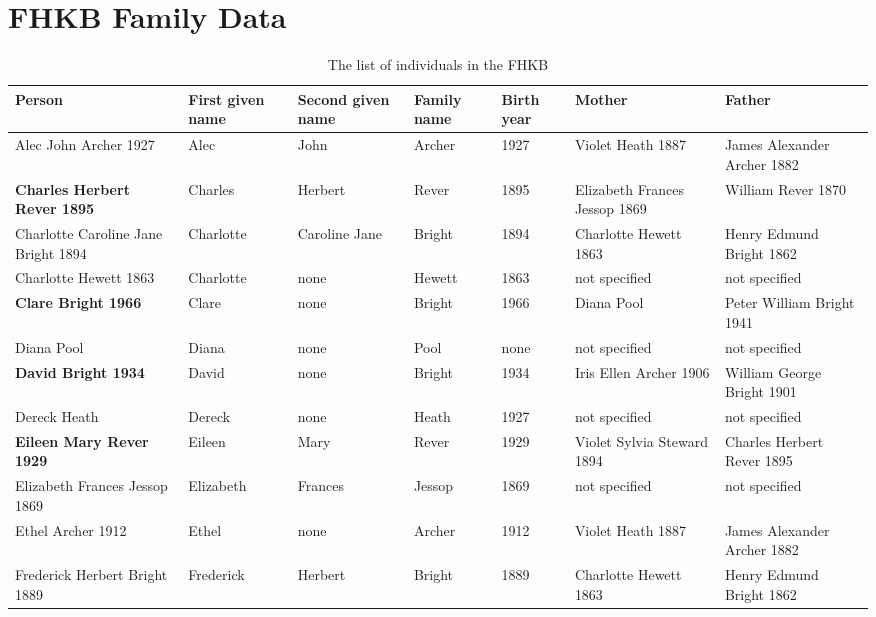 \chapter{FHKB Family Data}
\label{chap:familydata}
\begin{landscape}
\begingroup
\small
\begin{longtable}{lp{2cm}p{2cm}lp{2cm}ll}
\caption{The list of individuals in the FHKB}\\
\label{tab:familydata}
\endhead
\hline \multicolumn{7}{l}{\emph{continued..}}
\endfoot
\endlastfoot
\textbf{Person} & First given name & Second given name & Family name & Birth year & Mother & Father \\ \hline
Alec John Archer 1927 & Alec & John & Archer & 1927 & Violet Heath 1887  & James Alexander Archer 1882  \\
\textbf{Charles Herbert Rever 1895} & Charles & Herbert & Rever & 1895 & Elizabeth Frances Jessop 1869  & William Rever 1870  \\
Charlotte Caroline Jane Bright 1894 & Charlotte & Caroline Jane & Bright & 1894 & Charlotte Hewett 1863 & Henry Edmund Bright 1862 \\
Charlotte Hewett 1863 & Charlotte & none & Hewett & 1863 & not specified & not specified \\
\textbf{Clare Bright 1966} & Clare & none & Bright & 1966 & Diana Pool & Peter William Bright 1941  \\
Diana Pool & Diana & none & Pool & none & not specified & not specified  \\
\textbf{David Bright 1934} & David & none & Bright & 1934 & Iris Ellen Archer 1906  & William George Bright 1901  \\
Dereck Heath & Dereck & none & Heath & 1927 & not specified & not specified \\
\textbf{Eileen Mary Rever 1929} & Eileen & Mary & Rever & 1929 & Violet Sylvia Steward 1894  & Charles Herbert Rever 1895  \\
Elizabeth Frances Jessop 1869 & Elizabeth & Frances & Jessop & 1869 & not specified & not specified \\
Ethel Archer 1912 & Ethel & none & Archer & 1912 & Violet Heath 1887  & James Alexander Archer 1882  \\
Frederick Herbert Bright 1889 & Frederick & Herbert & Bright & 1889 & Charlotte Hewett 1863  & Henry Edmund Bright 1862  \\

\end{longtable}
\end{landscape}
